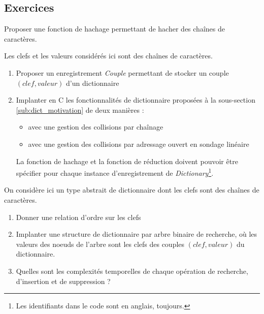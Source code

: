 \documentclass[../../../main.tex]{subfiles}
\begin{document}
\subsection{Exercices}
Proposer une fonction de hachage permettant de hacher des chaînes de caractères.

Les clefs et les valeurs considérés ici sont des chaînes de caractères.
\begin{enumerate}
	\item Proposer un enregistrement \textit{Couple} permettant de stocker un couple $(clef, valeur)$ d'un dictionnaire
	\item Implanter en C les fonctionnalités de dictionnaire proposées à la sous-section \ref{sub:dict_motivation} de deux manières :
		\begin{itemize}
			\item avec une gestion des collisions par chaînage
			\item avec une gestion des collisions par adressage ouvert en sondage linéaire
		\end{itemize}
		La fonction de hachage et la fonction de réduction doivent pouvoir être spécifier pour chaque instance d'enregistrement de \textit{Dictionary}\footnote{Les identifiants dans le code sont en anglais, toujours.}.
\end{enumerate}

On considère ici un type abstrait de dictionnaire dont les clefs sont des chaînes de caractères.
\begin{enumerate}
	\item Donner une relation d'ordre sur les clefs
	\item Implanter une structure de dictionnaire par arbre binaire de recherche, où les valeurs des noeuds de l'arbre sont les clefs des couples $(clef, valeur)$ du dictionnaire.
	\item Quelles sont les complexités temporelles de chaque opération de recherche, d'insertion et de suppression ?
\end{enumerate}




\end{document}
